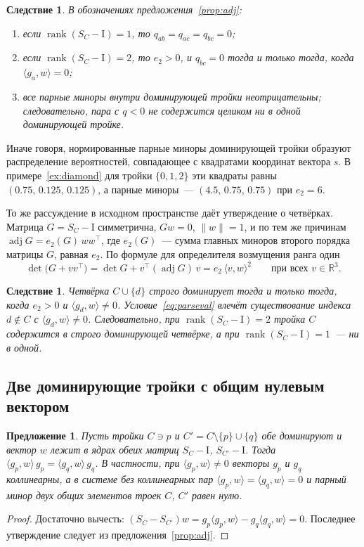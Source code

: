 \documentclass[11pt,a4paper]{article}
\theoremstyle{plain}
\newtheorem{proposition}[theorem]{Предложение}
\newtheorem{corollary}[theorem]{Следствие}
\theoremstyle{definition}
\theoremstyle{remark}
\DeclareMathOperator{\adj}{adj}
\DeclareMathOperator{\rank}{rank}
\newcommand{\RR}{\mathbb{R}}
\newcommand{\Id}{\mathrm{I}}
\newcommand{\T}{^{\!\top}}
\begin{document}
\begin{corollary}\label{cor:adj}
В обозначениях предложения~\ref{prop:adj}:
\begin{enumerate}
\item[\textup{1)}] если $\rank(S_C-\Id)=1$, то $q_{ab}=q_{ac}=q_{bc}=0$;
\item[\textup{2)}] если $\rank(S_C-\Id)=2$, то $e_2>0$, и $q_{bc}=0$ тогда и
  только тогда, когда $\langle g_a,w\rangle=0$;
\item[\textup{3)}] все парные миноры внутри доминирующей тройки
  неотрицательны; следовательно, пара с $q<0$ не содержится целиком ни в
  одной доминирующей тройке.
\end{enumerate}
\end{corollary}

Иначе говоря, нормированные парные миноры доминирующей тройки образуют
распределение вероятностей, совпадающее с квадратами координат вектора $s$.
В примере~\ref{ex:diamond} для тройки $\{0,1,2\}$ эти квадраты равны
$(0.75,\,0.125,\,0.125)$, а парные миноры~--- $(4.5,\,0.75,\,0.75)$ при
$e_2=6$.

То же рассуждение в исходном пространстве даёт утверждение о четвёрках.
Матрица $G=S_C-\Id$ симметрична, $Gw=0$, $\|w\|=1$, и по тем же причинам
$\adj G=e_2(G)\,ww\T$, где $e_2(G)$~--- сумма главных миноров второго порядка
матрицы $G$, равная $e_2$. По формуле для определителя возмущения ранга один
\begin{equation}\label{eq:fourset}
  \det\bigl(G+vv\T\bigr)=\det G+v\T(\adj G)\,v=e_2\,\langle v,w\rangle^2
  \qquad\text{при всех }v\in\RR^3.
\end{equation}

\begin{corollary}\label{cor:fourset}
Четвёрка $C\cup\{d\}$ строго доминирует тогда и только тогда, когда $e_2>0$
и $\langle g_d,w\rangle\ne0$. Условие~\eqref{eq:parseval} влечёт
существование индекса $d\notin C$ с $\langle g_d,w\rangle\ne0$. Следовательно,
при $\rank(S_C-\Id)=2$ тройка $C$ содержится в строго доминирующей четвёрке,
а при $\rank(S_C-\Id)=1$~--- ни в одной.
\end{corollary}

\subsection{Две доминирующие тройки с общим нулевым вектором}\label{sub:mirror}

\begin{proposition}\label{prop:mirror}
Пусть тройки $C\ni p$ и $C'=C\setminus\{p\}\cup\{q\}$ обе доминируют и
вектор $w$ лежит в ядрах обеих матриц $S_C-\Id$, $S_{C'}-\Id$. Тогда
$\langle g_p,w\rangle\,g_p=\langle g_q,w\rangle\,g_q$. В частности, при
$\langle g_p,w\rangle\ne0$ векторы $g_p$ и $g_q$ коллинеарны, а в системе без
коллинеарных пар $\langle g_p,w\rangle=\langle g_q,w\rangle=0$ и парный минор
двух общих элементов троек $C$, $C'$ равен нулю.
\end{proposition}
\begin{proof}
Достаточно вычесть: $(S_C-S_{C'})w=g_p\langle g_p,w\rangle-g_q\langle g_q,w\rangle=0$.
Последнее утверждение следует из предложения~\ref{prop:adj}.
\end{proof}
\end{document}
